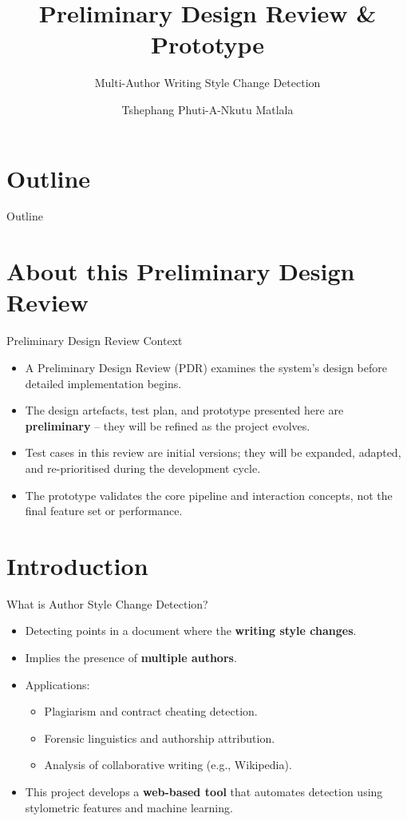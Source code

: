 \documentclass[compress,aspectratio=169]{beamer}
\title[PDR \& Prototype]{Preliminary Design Review \& Prototype}
\subtitle{Multi-Author Writing Style Change Detection}
\author[T.P. Matlala]{Tshephang Phuti-A-Nkutu Matlala\\[0.5em]}
\institute[Academy of Computer Science and Software Engineering]{
    Academy of Computer Science and Software Engineering\\
    University of Johannesburg\\ South Africa}
\date{}
\begin{document}
\begin{frame}
    \titlepage
\end{frame}

\section*{Outline}
\begin{frame}{Outline}
    \tableofcontents
\end{frame}

\section{About this Preliminary Design Review}
\begin{frame}{Preliminary Design Review Context}
    \begin{itemize}
        \item A Preliminary Design Review (PDR) examines the system’s design before detailed implementation begins.
        \item The design artefacts, test plan, and prototype presented here are \textbf{preliminary} – they will be refined as the project evolves.
        \item Test cases in this review are initial versions; they will be expanded, adapted, and re-prioritised during the development cycle.
        \item The prototype validates the core pipeline and interaction concepts, not the final feature set or performance.
    \end{itemize}
\end{frame}

\section{Introduction}
\begin{frame}{What is Author Style Change Detection?}
    \begin{itemize}
        \item Detecting points in a document where the \textbf{writing style changes}.
        \item Implies the presence of \textbf{multiple authors}.
        \item Applications:
        \begin{itemize}
            \item Plagiarism and contract cheating detection.
            \item Forensic linguistics and authorship attribution.
            \item Analysis of collaborative writing (e.g., Wikipedia).
        \end{itemize}
        \item This project develops a \textbf{web-based tool} that automates detection using stylometric features and machine learning.
    \end{itemize}
\end{frame}
\end{document}

